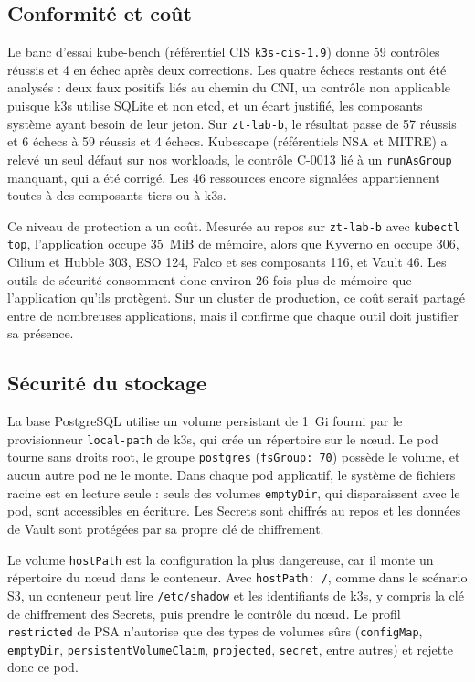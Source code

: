 \documentclass[11pt,a4paper]{article}
\newcommand{\code}[1]{\texttt{#1}}
\begin{document}
\subsection{Conformité et coût}

Le banc d'essai kube-bench (référentiel CIS \code{k3s-cis-1.9}) donne 59 contrôles réussis et 4 en échec après deux corrections. Les quatre échecs restants ont été analysés : deux faux positifs liés au chemin du CNI, un contrôle non applicable puisque k3s utilise SQLite et non etcd, et un écart justifié, les composants système ayant besoin de leur jeton. Sur \code{zt-lab-b}, le résultat passe de 57 réussis et 6 échecs à 59 réussis et 4 échecs. Kubescape (référentiels NSA et MITRE) a relevé un seul défaut sur nos workloads, le contrôle C-0013 lié à un \code{runAsGroup} manquant, qui a été corrigé. Les 46 ressources encore signalées appartiennent toutes à des composants tiers ou à k3s.

Ce niveau de protection a un coût. Mesurée au repos sur \code{zt-lab-b} avec \code{kubectl top}, l'application occupe 35~MiB de mémoire, alors que Kyverno en occupe 306, Cilium et Hubble 303, ESO 124, Falco et ses composants 116, et Vault 46. Les outils de sécurité consomment donc environ 26 fois plus de mémoire que l'application qu'ils protègent. Sur un cluster de production, ce coût serait partagé entre de nombreuses applications, mais il confirme que chaque outil doit justifier sa présence.

\subsection{Sécurité du stockage}

La base PostgreSQL utilise un volume persistant de 1~Gi fourni par le provisionneur \code{local-path} de k3s, qui crée un répertoire sur le nœud. Le pod tourne sans droits root, le groupe \code{postgres} (\code{fsGroup: 70}) possède le volume, et aucun autre pod ne le monte. Dans chaque pod applicatif, le système de fichiers racine est en lecture seule : seuls des volumes \code{emptyDir}, qui disparaissent avec le pod, sont accessibles en écriture. Les Secrets sont chiffrés au repos et les données de Vault sont protégées par sa propre clé de chiffrement.

Le volume \code{hostPath} est la configuration la plus dangereuse, car il monte un répertoire du nœud dans le conteneur. Avec \code{hostPath: /}, comme dans le scénario S3, un conteneur peut lire \code{/etc/shadow} et les identifiants de k3s, y compris la clé de chiffrement des Secrets, puis prendre le contrôle du nœud. Le profil \code{restricted} de PSA n'autorise que des types de volumes sûrs (\code{configMap}, \code{emptyDir}, \code{persistentVolumeClaim}, \code{projected}, \code{secret}, entre autres) et rejette donc ce pod.
\end{document}
